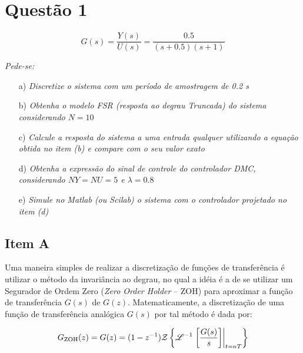 \chapter*{Questão 1}

\begin{equation}\nonumber
G(s) = \frac{Y(s)}{U(s)} = \frac{0.5}{(s+0.5)(s+1)}
\end{equation}

{\it Pede-se:}

\begin{itemize}
    \item[a)] {\it Discretize o sistema com um período de amostragem de 0.2 s}
    \item[b)] {\it Obtenha o modelo FSR (resposta ao degrau Truncada) do sistema
              considerando $N = 10$}
    \item[c)] {\it Calcule a resposta do sistema a uma entrada qualquer
              utilizando a equação obtida no item (b) e compare com o seu valor 
              exato}
    \item[d)] {\it Obtenha a expressão do sinal de controle do controlador DMC,
              considerando $NY = NU = 5$ e $\lambda = 0.8$}
    \item[e)] {\it Simule no Matlab (ou Scilab) o sistema com o controlador
              projetado no item (d)}
\end{itemize}

\vspace{0.5cm}


\vspace{0.25cm}

\section*{Item A}
Uma maneira simples de realizar a discretização de funções de transferência é
utilizar o método da invariância ao degrau, no qual a idéia é a de se utilizar
um Segurador de Ordem Zero ({\it Zero Order Holder} -- ZOH) para aproximar a
função de transferência $G(s)$ de $G(z)$. Matematicamente, a discretização de
uma função de transferência analógica $G(s)$ por tal método é dada por:

\begin{equation}\label{eq:Gzoh}
G_{\text{ZOH}}(z) = 
G(z) = (1 - z^{-1})
       \mathcal{Z}\left\{\mathscr{L}^{-1}\left.\left[\frac{G(s)}{s}\right]\right|_{t = nT}\right\}
\end{equation}

